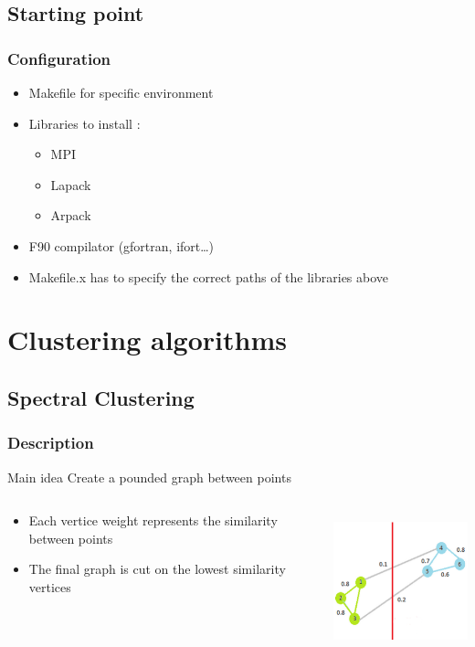 \documentclass[10p]{beamer}
\begin{document}
\subsection{Starting point}
\begin{frame}
\frametitle{Configuration}
\begin{itemize}
\item Makefile for specific environment
\item Libraries to install :
\begin{itemize}
\item MPI
\item Lapack
\item Arpack
\end{itemize}
\item F90 compilator (gfortran, ifort…)
\item Makefile.x has to specify the correct paths of the libraries above
\end{itemize}
\end{frame}
\section{Clustering algorithms}
\subsection{Spectral Clustering}
\begin{frame}
\frametitle{Description}
\begin{block}{Main idea}
Create a pounded graph between points
\end{block}
\vfill
\begin{columns}
\begin{column}{0.6\textwidth}
\begin{itemize}
\item Each vertice weight represents the similarity between points
\item The final graph is cut on the lowest similarity vertices
\end{itemize}
\end{column}
\begin{column}{0.4\textwidth}
\includegraphics[width=\columnwidth, height=4cm]{Image/graph.png}
\end{column}
\end{columns}
\end{frame}
\end{document}
